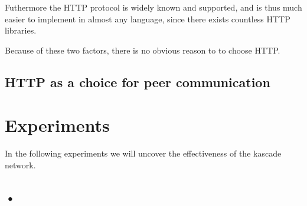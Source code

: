 \documentclass{acm_proc_article-sp}
\begin{document}
Futhermore the HTTP protocol is widely known and supported, and is thus much easier to implement in almost any language, since there exists countless HTTP libraries. 

Because of these two factors, there is no obvious reason to to choose HTTP.

\subsection{HTTP as a choice for peer communication}


\section{Experiments}
In the following experiments we will uncover the effectiveness of the kascade network.

\subsection{•}
\end{document}
